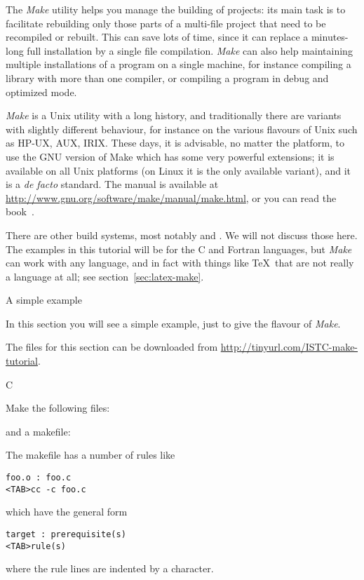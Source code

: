 
The \emph{Make} utility helps you manage the building of
projects: its main task is to facilitate rebuilding only those parts 
of a multi-file project that need to be recompiled or rebuilt.
This can save lots of time, since it
can replace a minutes-long full installation by a single file
compilation. \emph{Make} can also help maintaining multiple
installations of a program on a single machine, for instance compiling
a library with more than one compiler, or compiling a program in debug
and optimized mode.

\emph{Make} is a Unix utility with a long history, and traditionally
there are variants with slightly different behaviour, 
for instance on the various
flavours of Unix such as HP-UX, AUX, IRIX. 
These days, it is advisable, no
matter the platform, to use the GNU version of Make which has some
very powerful extensions; it is available on all Unix platforms
(on Linux it is the only available variant), and it is a {\it de
  facto} standard. The manual is available at
\url{http://www.gnu.org/software/make/manual/make.html}, or you can
read the book~\cite{OReilly-GnuMake}.

There are other build systems, most notably  and
. We will not discuss those here. The examples in this
tutorial will be for the C and Fortran languages, but \emph{Make} can
work with any language, and in fact with things like \TeX\ that are
not really a language at all; see section~\ref{sec:latex-make}.

 {A simple example}

\begin{purpose}
In this section you will see a simple example, just to give the flavour of
\emph{Make}.
\end{purpose}

The files for this section can be downloaded from
\url{http://tinyurl.com/ISTC-make-tutorial}.

 {C}

Make the following files:

and a makefile:

The makefile has a number of rules like
\begin{verbatim}
foo.o : foo.c
<TAB>cc -c foo.c
\end{verbatim}
which have the general form
\begin{verbatim}
target : prerequisite(s)
<TAB>rule(s)
\end{verbatim}
where the rule lines are indented by a  character.

